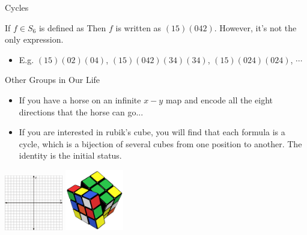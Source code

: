 \begin{frame}{Cycles}
    \begin{example}
        If $f\in S_6$ is defined as
        Then $f$ is written as $(15)(042)$. However, it's not the only expression.
    \end{example}
    \begin{itemize}
        \item E.g. $(15)(02)(04)$, $(15)(042)(34)(34)$, $(15)(024)(024)$, $\cdots$
    \end{itemize}
\end{frame}

\begin{frame}{Other Groups in Our Life}
    \begin{minipage}{0.6\linewidth}
        \begin{example}
            \begin{itemize}
                \item If you have a horse on an infinite $x-y$ map and encode all the eight directions that the horse can go...
                \item If you are interested in rubik's cube, you will find that each formula is a cycle, which is a bijection of several cubes from one position to another. The identity is the initial status.
            \end{itemize}
        \end{example}
    \end{minipage}
    \hfill
    \begin{minipage}{0.3\linewidth}
        \includegraphics[width=1in]{../images/map}
        \includegraphics[width=1in]{../images/cube}
    \end{minipage}
\end{frame}